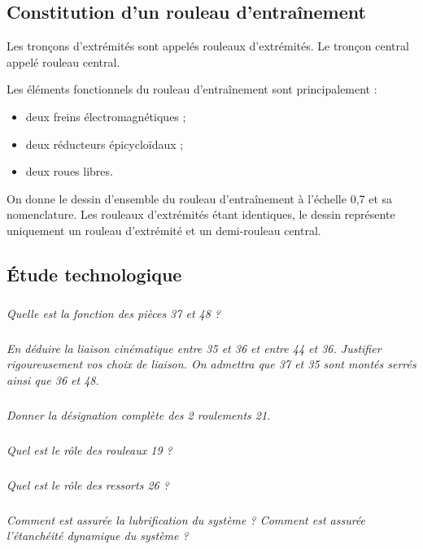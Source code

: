 \documentclass[10pt]{article}
\begin{document}
\subsection*{Constitution d’un rouleau d’entraînement}
Les tronçons d’extrémités sont appelés rouleaux d’extrémités. Le tronçon central appelé rouleau central.

Les éléments fonctionnels du rouleau d’entraînement sont principalement : 
\begin{itemize}
\item deux freins électromagnétiques ;
\item deux réducteurs épicycloïdaux ;
\item deux roues libres.
\end{itemize}

On donne le dessin d’ensemble du rouleau d’entraînement à l’échelle 0,7 et sa nomenclature. Les rouleaux d’extrémités étant identiques, le dessin représente uniquement un rouleau d’extrémité et un demi-rouleau central.

\subsection*{Étude technologique}
\subparagraph{}
\textit{Quelle est la fonction des pièces 37 et 48 ?} %

\subparagraph{}
\textit{En déduire la liaison cinématique entre 35 et 36 et entre 44 et 36. Justifier rigoureusement vos choix de liaison. On admettra que 37 et 35 sont montés serrés ainsi que 36 et 48.}

\subparagraph{}
\textit{Donner la désignation complète des 2 roulements 21.}%
\subparagraph{}
\textit{Quel est le rôle des rouleaux 19 ?}%

\subparagraph{}
\textit{Quel est le rôle des ressorts 26 ?}

\subparagraph{}
\textit{Comment est assurée la lubrification du système ? Comment est assurée l’étanchéité dynamique du système ?}



\end{document}
